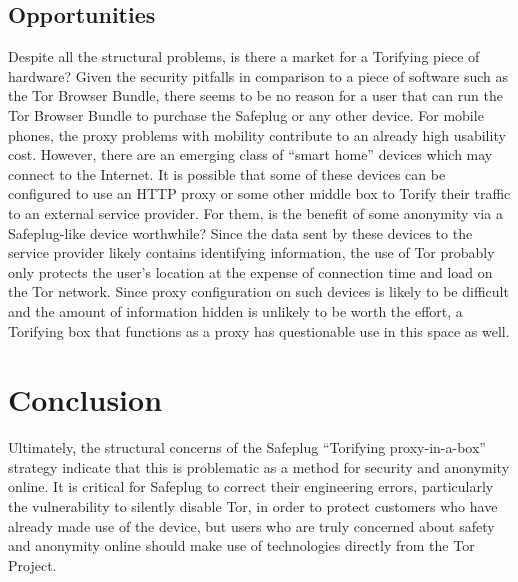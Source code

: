 \documentclass[conference]{IEEEtran}
\begin{document}
\subsection{Opportunities}
Despite all the structural problems, is there a market for a Torifying piece of hardware?  Given the security pitfalls in comparison to a piece of software such as the Tor Browser Bundle, there seems to be no reason for a user that can run the Tor Browser Bundle to purchase the Safeplug or any other device.  For mobile phones, the proxy problems with mobility contribute to an already high usability cost.  However, there are an emerging class of ``smart home'' devices which may connect to the Internet.  It is possible that some of these devices can be configured to use an HTTP proxy or some other middle box to Torify their traffic to an external service provider.  For them, is the benefit of some anonymity via a Safeplug-like device worthwhile?  Since the data sent by these devices to the service provider likely contains identifying information, the use of Tor probably only protects the user's location at the expense of connection time and load on the Tor network.  Since proxy configuration on such devices is likely to be difficult and the amount of information hidden is unlikely to be worth the effort, a Torifying box that functions as a proxy has questionable use in this space as well.

\section{Conclusion}
Ultimately, the structural concerns of the Safeplug ``Torifying proxy-in-a-box'' strategy indicate that this is problematic as a method for security and anonymity online.  It is critical for Safeplug to correct their engineering errors, particularly the vulnerability to silently disable Tor, in order to protect customers who have already made use of the device, but users who are truly concerned about safety and anonymity online should make use of technologies directly from the Tor Project.


\end{document}
